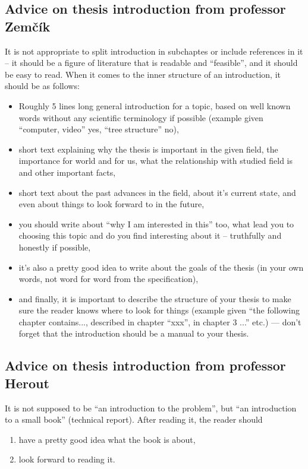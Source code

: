 {{\subsection*{Advice on thesis introduction from professor Zemčík}
It is not appropriate to split introduction in subchaptes or include references in it -- it should be a figure of literature that is readable and ``feasible'', and it should be easy to read. When it comes to the inner structure of an introduction, it should be as follows:
\begin{itemize}
  \item{Roughly 5 lines long general introduction for a topic, based on well known words without any scientific terminology if possible (example given ``computer, video'' yes, ``tree structure'' no),}
  \item{short text explaining why the thesis is important in the given field, the importance for world and for us, what the relationship with studied field is and other important facts,}
  \item{short text about the past advances in the field, about it's current state, and even about things to look forward to in the future,}
  \item{you should write about ``why I am interested in this'' too, what lead you to choosing this topic and do you find interesting about it -- truthfully and honestly if possible,}
  \item{it's also a pretty good idea to write about the goals of the thesis (in your own words, not word for word from the specification),}
  \item{and finally, it is important to describe the structure of your thesis to make sure the reader knows where to look for things (example given ``the following chapter contains..., described in chapter ``xxx'', in chapter 3 ...'' etc.) --- don't forget that the introduction should be a manual to your thesis.}
\end{itemize}

\begin{samepage}
\subsection*{Advice on thesis introduction from professor Herout}
It is not supposed to be ``an introduction to the problem'', but ``an introduction to a small book'' (technical report). After reading it, the reader should
\begin{enumerate}
  \item{have a pretty good idea what the book is about,}
  \item{look forward to reading it.}
\end{enumerate}
\end{samepage}

}}

